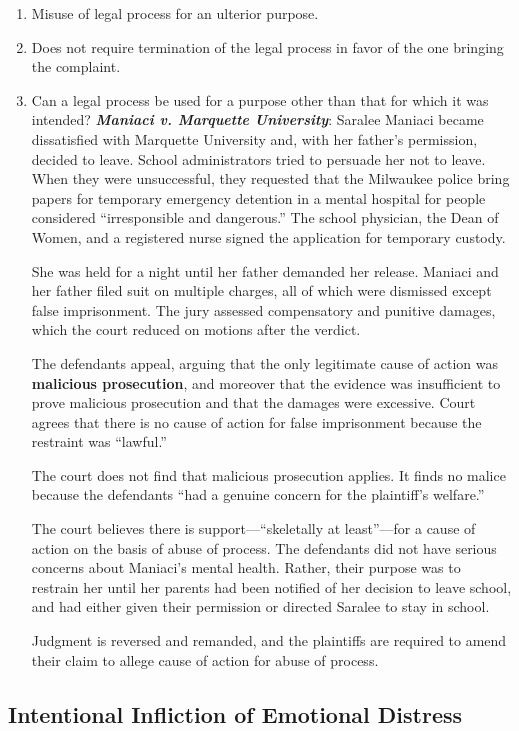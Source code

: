 \begin{enumerate}
    \item Misuse of legal process for an ulterior purpose.
    \item Does not require termination of the legal process in favor of the one bringing the complaint.
    \item Can a legal process be used for a purpose other than that for which it was intended? \textbf{\emph{Maniaci v. Marquette University}}: Saralee Maniaci became dissatisfied with Marquette University and, with her father's permission, decided to leave. School administrators tried to persuade her not to leave. When they were unsuccessful, they requested that the Milwaukee police bring papers for temporary emergency detention in a mental hospital for people considered ``irresponsible and dangerous.'' The school physician, the Dean of Women, and a registered nurse signed the application for temporary custody.

She was held for a night until her father demanded her release. Maniaci and her father filed suit on multiple charges, all of which were dismissed except false imprisonment. The jury assessed compensatory and punitive damages, which the court reduced on motions after the verdict.

The defendants appeal, arguing that the only legitimate cause of action was \textbf{malicious prosecution}, and moreover that the evidence was insufficient to prove malicious prosecution and that the damages were excessive. Court agrees that there is no cause of action for false imprisonment because the restraint was ``lawful.''

The court does not find that malicious prosecution applies. It finds no malice because the defendants ``had a genuine concern for the plaintiff's welfare.''

The court believes there is support---``skeletally at least''---for a cause of action on the basis of abuse of process. The defendants did not have serious concerns about Maniaci's mental health. Rather, their purpose was to restrain her until her parents had been notified of her decision to leave school, and had either given their permission or directed Saralee to stay in school.

Judgment is reversed and remanded, and the plaintiffs are required to amend their claim to allege cause of action for abuse of process.
\end{enumerate}

\subsection{Intentional Infliction of Emotional Distress}

